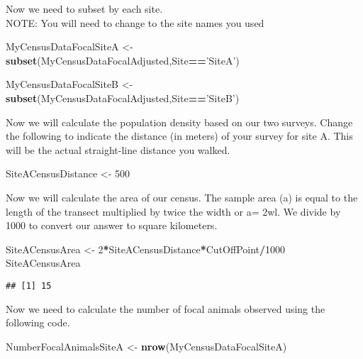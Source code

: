 \documentclass[]{book}
\newenvironment{Shaded}{\begin{snugshade}}{\end{snugshade}}
\newcommand{\DecValTok}[1]{\textcolor[rgb]{0.00,0.00,0.81}{#1}}
\newcommand{\KeywordTok}[1]{\textcolor[rgb]{0.13,0.29,0.53}{\textbf{#1}}}
\newcommand{\NormalTok}[1]{#1}
\newcommand{\OperatorTok}[1]{\textcolor[rgb]{0.81,0.36,0.00}{\textbf{#1}}}
\newcommand{\StringTok}[1]{\textcolor[rgb]{0.31,0.60,0.02}{#1}}
\begin{document}
Now we need to subset by each site.\\
NOTE: You will need to change to the site names you used

\begin{Shaded}
\begin{Highlighting}[]
\NormalTok{MyCensusDataFocalSiteA <-}\StringTok{ }\KeywordTok{subset}\NormalTok{(MyCensusDataFocalAdjusted,Site}\OperatorTok{==}\StringTok{'SiteA'}\NormalTok{)}

\NormalTok{MyCensusDataFocalSiteB <-}\StringTok{ }\KeywordTok{subset}\NormalTok{(MyCensusDataFocalAdjusted,Site}\OperatorTok{==}\StringTok{'SiteB'}\NormalTok{)}
\end{Highlighting}
\end{Shaded}

Now we will calculate the population density based on our two surveys. Change the following to indicate the distance (in meters) of your survey for site A. This will be the actual straight-line distance you walked.

\begin{Shaded}
\begin{Highlighting}[]
\NormalTok{SiteACensusDistance <-}\StringTok{ }\DecValTok{500}
\end{Highlighting}
\end{Shaded}

Now we will calculate the area of our census. The sample area (a) is equal to the length of the transect multiplied by twice the width or a= 2wl. We divide by 1000 to convert our answer to square kilometers.

\begin{Shaded}
\begin{Highlighting}[]
\NormalTok{SiteACensusArea <-}\StringTok{ }\DecValTok{2}\OperatorTok{*}\NormalTok{SiteACensusDistance}\OperatorTok{*}\NormalTok{CutOffPoint}\OperatorTok{/}\DecValTok{1000}
\NormalTok{SiteACensusArea}
\end{Highlighting}
\end{Shaded}

\begin{verbatim}
## [1] 15
\end{verbatim}

Now we need to calculate the number of focal animals observed using the following code.

\begin{Shaded}
\begin{Highlighting}[]
\NormalTok{NumberFocalAnimalsSiteA <-}\StringTok{ }\KeywordTok{nrow}\NormalTok{(MyCensusDataFocalSiteA)}
\end{Highlighting}
\end{Shaded}
\end{document}
